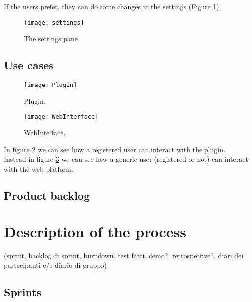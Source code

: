 \documentclass[a4paper,10pt]{report}
\begin{document}
\newpage
If the users prefer, they can do some changes in the settings (Figure \ref{fig:settings}).




\begin{figure}[h]
	\centering 
	\texttt{[image: settings]}
	\caption{The settings pane}
	\label{fig:settings}
\end{figure}



\newpage
\section{Use cases}

\begin{figure}[H]
	\centering
    \texttt{[image: Plugin]}
    \caption{Plugin.}
    \label{fig:plugin}
\end{figure}

\begin{figure}[H]
	\centering
    \texttt{[image: WebInterface]}
    \caption{WebInterface.}
    \label{fig:web}
\end{figure}

In figure \ref{fig:plugin} we can see how a registered user can interact with the plugin.\\
Instead in figure \ref{fig:web} we can see how a generic user (registered or not) can interact with the web platform.\\

\section{Product backlog}

\chapter{Description of the process}
(sprint, backlog di sprint, burndown, test fatti, demo?, retrospettive?, diari dei partecipanti e/o diario di gruppo)
\section{Sprints}
\end{document}
